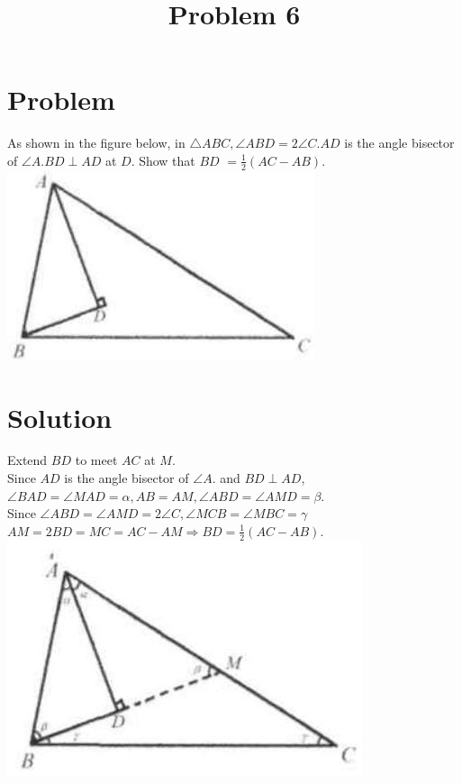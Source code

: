 \documentclass{article}
\title{Problem 6}
\date{}
\begin{document}
\maketitle

\section*{Problem}
As shown in the figure below, in \(\triangle A B C, \angle A B D=2 \angle C . A D\) is the angle bisector of \(\angle A . B D \perp A D\) at \(D\). Show that \(B D\) \(=\frac{1}{2}(A C-A B)\).\\
\centering
\includegraphics[width=\textwidth]{images/problem_image_1.jpg}

\section*{Solution}
Extend \(B D\) to meet \(A C\) at \(M\).\\
Since \(A D\) is the angle bisector of \(\angle A\). and \(B D \perp A D\), \(\angle B A D=\angle M A D=\alpha, A B=A M, \angle A B D=\angle A M D=\beta\).\\
Since \(\angle A B D=\angle A M D=2 \angle C, \angle M C B=\angle M B C=\gamma\) \(A M=2 B D=M C=A C-A M \Rightarrow B D=\frac{1}{2}(A C-A B)\).\\
\centering
\includegraphics[width=\textwidth]{images/reasoning_image_1.jpg}
\end{document}
